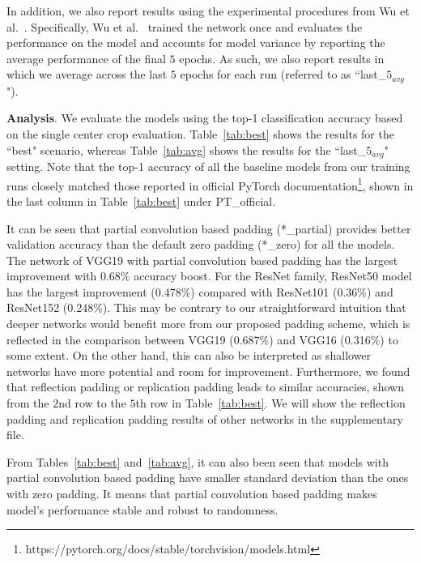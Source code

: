 \documentclass[10pt,twocolumn,letterpaper]{article}
\begin{document}
In addition, we also report results using the experimental procedures from Wu et al.~\cite{wu2018group}. Specifically, Wu et al.~\cite{wu2018group} trained the network once and evaluates the performance on the model and accounts for model variance by reporting the average performance of the final $5$ epochs. As such, we also report results in which we average across the last $5$ epochs for each run (referred to as ``last\_$5_{avg}$").

\textbf{Analysis}. We evaluate the models using the top-1 classification accuracy based on the single center crop evaluation. Table~\ref{tab:best} shows the results for the ``best" scenario, whereas Table~\ref{tab:avg} shows the results for the ``last\_$5_{avg}$" setting. Note that the top-1 accuracy of all the baseline models from our training runs closely matched those reported in official PyTorch documentation\footnote{https://pytorch.org/docs/stable/torchvision/models.html}, shown in the last column in Table~\ref{tab:best} under PT\_official. 

It can be seen that partial convolution based padding (*\_partial) provides better validation accuracy than the default zero padding (*\_zero) for all the models. The network of VGG19 with partial convolution based padding has the largest improvement with 0.68\% accuracy boost. For the ResNet family, ResNet50 model has the largest improvement (0.478\%) compared with ResNet101 (0.36\%) and ResNet152 (0.248\%). This may be contrary to our straightforward intuition that deeper networks would benefit more from our proposed padding scheme, which is reflected in the comparison between VGG19 (0.687\%) and VGG16 (0.316\%) to some extent. On the other hand, this can also be interpreted as shallower networks have more potential and room for improvement. Furthermore, we found that reflection padding or replication padding leads to similar accuracies, shown from the $2$nd row to the $5$th row in Table~\ref{tab:best}. We will show the reflection padding and replication padding results of other networks in the supplementary file. 

From Tables~\ref{tab:best} and~\ref{tab:avg}, it can also been seen that models with partial convolution based padding have smaller standard deviation than the ones with zero padding. It means that partial convolution based padding makes model's performance stable and robust to randomness.
\end{document}
